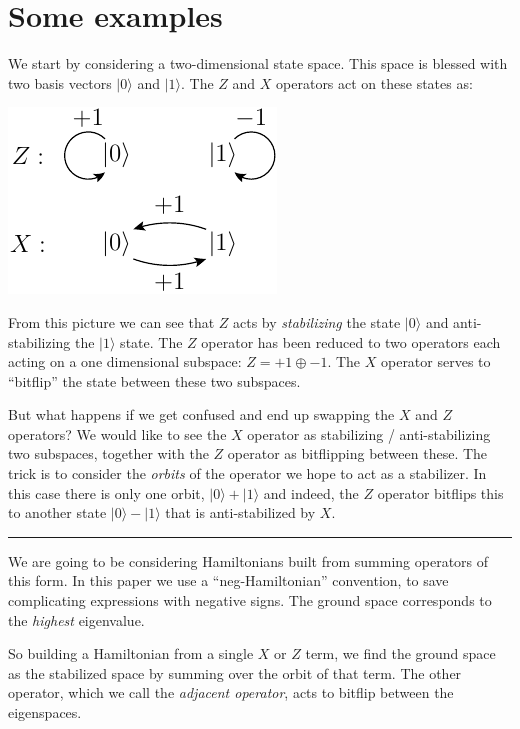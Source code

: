 \documentclass[11pt,oneside]{article}
\newcommand{\ket}[1]{|{#1}\rangle}
\newcommand\doexample[1]{\vskip 5pt \noindent {\bf \underline{Example #1.}\ }}
\newcommand\tombstone{\rule{.36em}{2ex}\vskip 5pt}
\newcounter{numitem}
\newcommand{\numitem}[1]{\refstepcounter{numitem}\thenumitem\label{#1}}
\begin{document}
\section{Some examples}\label{Sec2}

\doexample{\numitem{Ex1}}
We start by considering a two-dimensional state space.
This space is blessed with two basis vectors $\ket{0}$ and $\ket{1}.$
The $Z$ and $X$ operators act on these states as:
\begin{center}
\includegraphics[]{pic-zx.pdf}
\end{center}
From this picture we can see that $Z$ acts by \emph{stabilizing} the
state $\ket{0}$ and anti-stabilizing the $\ket{1}$ state.
The $Z$ operator has been reduced 
to two operators each acting on a one dimensional subspace:
$Z = +1 \oplus -1.$
The $X$ operator serves to ``bitflip'' the state between
these two subspaces.

But what happens if we get confused and end up swapping
the $X$ and $Z$ operators? We would like to see the $X$ operator
as stabilizing / anti-stabilizing two subspaces, together with the
$Z$ operator as bitflipping between these.
The trick is to consider the \emph{orbits} of the operator
we hope to act as a stabilizer.
In this case there is only one orbit, $\ket{0}+\ket{1}$
and indeed, the $Z$ operator bitflips this to another state
$\ket{0}-\ket{1}$ that is anti-stabilized by $X.$
\tombstone

We are going to be considering Hamiltonians built from
summing operators of this form.
In this paper we use a ``neg-Hamiltonian'' convention,
to save complicating expressions with negative signs.
The ground space corresponds to the \emph{highest} eigenvalue.

So building a Hamiltonian from a single $X$ or $Z$ term,
we find the ground space as the stabilized space
by summing over the orbit of that term.
The other operator,
which we call the \emph{adjacent operator}, acts to bitflip
between the eigenspaces.
\end{document}
